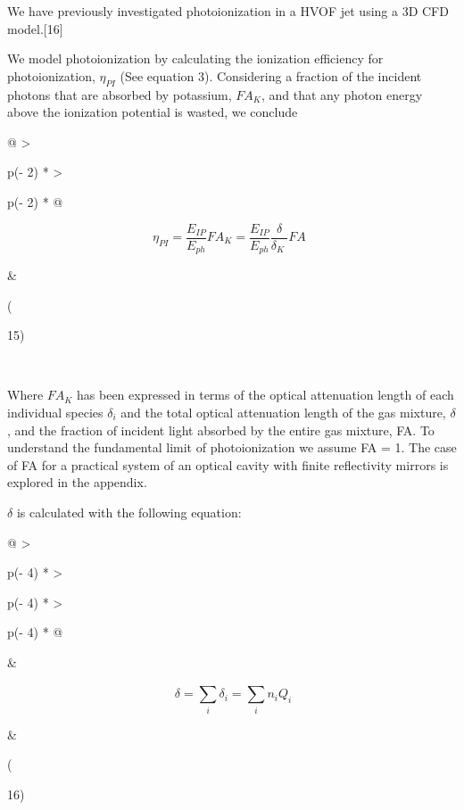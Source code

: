 We have previously investigated photoionization in a HVOF jet using a 3D CFD model.{[}16{]}

We model photoionization by calculating the ionization efficiency for photoionization, \(\eta_{PI}\) (See equation 3). Considering a fraction of the incident photons that are absorbed by potassium, \(FA_{K}\), and that any photon energy above the ionization potential is wasted, we conclude

\begin{longtable}[]{@{}
  >{\raggedright\arraybackslash}p{(\columnwidth - 2\tabcolsep) * }
  >{\raggedright\arraybackslash}p{(\columnwidth - 2\tabcolsep) * }@{}}
\toprule
\begin{minipage}[b]{\linewidth}\raggedright
\[\eta_{PI} = \frac{E_{IP}}{E_{ph}}FA_{K} = \frac{E_{IP}}{E_{ph}}\frac{\delta}{\delta_{K}\ }FA\ \ \]
\end{minipage} & \begin{minipage}[b]{\linewidth}\raggedright
(

15)
\end{minipage} \\
\midrule
\endhead
\bottomrule
\end{longtable}

Where \(FA_{K}\) has been expressed in terms of the optical attenuation length of each individual species \(\delta_{i}\) and the total optical attenuation length of the gas mixture, \(\delta\), and the fraction of incident light absorbed by the entire gas mixture, FA. To understand the fundamental limit of photoionization we assume FA = 1. The case of FA for a practical system of an optical cavity with finite reflectivity mirrors is explored in the appendix.

\(\delta\) is calculated with the following equation:

\begin{longtable}[]{@{}
  >{\raggedright\arraybackslash}p{(\columnwidth - 4\tabcolsep) * }
  >{\raggedright\arraybackslash}p{(\columnwidth - 4\tabcolsep) * }
  >{\raggedright\arraybackslash}p{(\columnwidth - 4\tabcolsep) * }@{}}
\toprule
\begin{minipage}[b]{\linewidth}\raggedright
\end{minipage} & \begin{minipage}[b]{\linewidth}\raggedright
\[\ \delta = \sum_{i}^{}\delta_{i} = \sum_{i}^{}{n_{i}Q_{i}}\]
\end{minipage} & \begin{minipage}[b]{\linewidth}\raggedright
(

16)
\end{minipage} \\
\midrule
\endhead
\bottomrule
\end{longtable}

